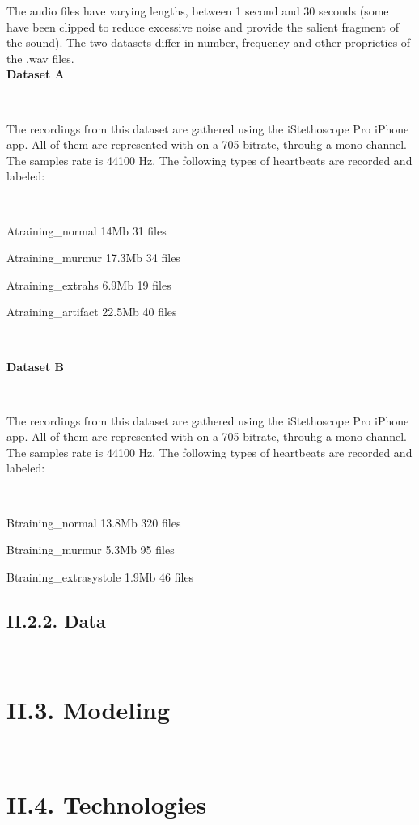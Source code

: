 \documentclass[11pt, a4papper]{report}
\theoremstyle{plain}
\theoremstyle{definition}
\theoremstyle{definition}
\theoremstyle{proposition}
\begin{document}
The audio files have varying lengths, between 1 second and 30 seconds (some have been clipped to reduce excessive noise and provide the salient fragment of the sound). The two datasets differ in number, frequency and other proprieties of the .wav files.
\\

\textbf{Dataset A}

\

The recordings from this dataset are gathered using the iStethoscope Pro iPhone app. All of them are represented with on a 705  bitrate, throuhg a mono channel. The samples rate is 44100 Hz. The following types of heartbeats are recorded and labeled:

\

Atraining\_normal 14Mb 31 files
\

Atraining\_murmur 17.3Mb 34 files
\

Atraining\_extrahs 6.9Mb 19 files
\

Atraining\_artifact 22.5Mb 40 files

\

\textbf{Dataset B}

\

The recordings from this dataset are gathered using the iStethoscope Pro iPhone app. All of them are represented with on a 705  bitrate, throuhg a mono channel. The samples rate is 44100 Hz. The following types of heartbeats are recorded and labeled:

\

Btraining\_normal 13.8Mb 320 files
\

Btraining\_murmur 5.3Mb 95 files
\

Btraining\_extrasystole 1.9Mb 46 files
\


\subsection*{II.2.2. Data}

\

\section*{II.3. Modeling}

\

\section*{II.4. Technologies}
\end{document}
